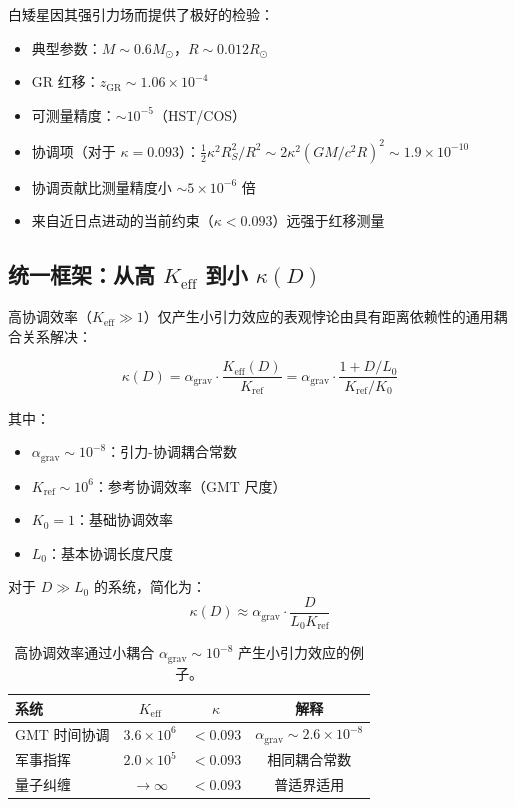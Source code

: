 \documentclass[11pt,a4paper]{article}
\begin{document}
	白矮星因其强引力场而提供了极好的检验：
	\begin{itemize}
		\item 典型参数：$M \sim 0.6 M_\odot$，$R \sim 0.012 R_\odot$
		\item GR 红移：$z_{\text{GR}} \sim 1.06\times10^{-4}$
		\item 可测量精度：$\sim 10^{-5}$（HST/COS）
		\item 协调项（对于 $\kappa = 0.093$）：$\frac{1}{2}\kappa^2 R_S^2/R^2 \sim 2\kappa^2 (GM/c^2R)^2 \sim 1.9\times10^{-10}$
		\item 协调贡献比测量精度小 $\sim 5\times10^{-6}$ 倍
		\item 来自近日点进动的当前约束（$\kappa < 0.093$）远强于红移测量
	\end{itemize}
	
	\subsection{统一框架：从高 $K_{\mathrm{eff}}$ 到小 $\kappa(D)$}
	
	高协调效率（$K_{\mathrm{eff}} \gg 1$）仅产生小引力效应的表观悖论由具有距离依赖性的通用耦合关系解决：
	
	\begin{equation}
		\boxed{\kappa(D) = \alpha_{\text{grav}} \cdot \frac{K_{\mathrm{eff}}(D)}{K_{\text{ref}}} 
			= \alpha_{\text{grav}} \cdot \frac{1 + D/L_0}{K_{\text{ref}}/K_0}}
	\end{equation}
	
	其中：
	\begin{itemize}
		\item $\alpha_{\text{grav}} \sim 10^{-8}$：引力-协调耦合常数
		\item $K_{\text{ref}} \sim 10^6$：参考协调效率（GMT 尺度）
		\item $K_0 = 1$：基础协调效率
		\item $L_0$：基本协调长度尺度
	\end{itemize}
	
	对于 $D \gg L_0$ 的系统，简化为：
	\begin{equation}
		\kappa(D) \approx \alpha_{\text{grav}} \cdot \frac{D}{L_0 K_{\text{ref}}}
	\end{equation}
	
	\begin{table}[htbp]
		\centering
		\begin{tabular}{lccc}
			\toprule
			\textbf{系统} & \textbf{$K_{\mathrm{eff}}$} & \textbf{$\kappa$} & \textbf{解释} \\
			\midrule
			GMT 时间协调 & $3.6\times10^6$ & $<0.093$ & $\alpha_{\text{grav}} \sim 2.6\times10^{-8}$ \\
			军事指挥 & $2.0\times10^5$ & $<0.093$ & 相同耦合常数 \\
			量子纠缠 & $\to\infty$ & $<0.093$ & 普适界适用 \\
			\bottomrule
		\end{tabular}
		\caption{高协调效率通过小耦合 $\alpha_{\text{grav}} \sim 10^{-8}$ 产生小引力效应的例子。}
	\end{table}
	
\end{document}
